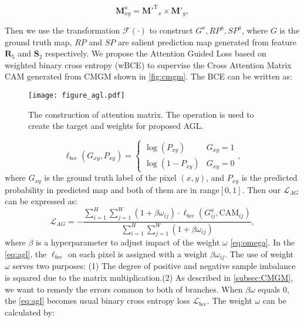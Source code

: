 \documentclass[10pt,twocolumn,letterpaper]{article}
\begin{document}
\begin{equation}
   \bm{M}^{a}_{xy} = {{\bm{M}'}^\mathrm{T}}_{x} \times \bm{M}'_{y} ,
    \label{eq:attention matrix}
\end{equation}

Then we use the transformation $\mathcal {F}(\cdot)$ to construct $G^{a},RP^{a},SP^{a}$, where $G$ is the ground truth map, $RP$ and $SP$ are salient prediction map generated from feature $\bm{R}_5$ and $\bm{S}_2$ respectively. We propose the Attention Guided Loss based on weighted binary cross entropy (wBCE) to supervise the Cross Attention Matrix $\mathrm{CAM}$ generated from CMGM shown in \cref{fig:cmgm}. The BCE \cite{de2005tutorial} can be written as:

\begin{figure}[ht]
\centering
\texttt{[image: figure\_agl.pdf]}
\caption{The construction of attention matrix. The operation is used to create the target and weights for proposed AGL. }
\label{fig:agl1}
\end{figure}

\begin{equation}
    \ell_{bce}(G_{xy},P_{xy}) = 
    \begin{cases}
    \log(P_{xy})& G_{xy}=1 \\
    \log(1-P_{xy})& G_{xy}=0
    \end{cases} ,
    \label{eq:bce}
\end{equation}
where $G_{xy}$ is the ground truth label of the pixel $(x,y)$, and $P_{xy}$ is the predicted probability in predicted map and both of them are in range$[0,1]$. Then our $\mathcal{L}_{AG}$ can be expressed as:
\begin{equation}
    \mathcal{L}_{AG}=-\frac{\sum\limits^H_{i=1}\sum\limits^W_{j=1}(1+\beta\omega_{ij})\cdot \ell_{bce}(G^a_{ij},{\mathrm{CAM}}_{ij})}{\sum\limits^H_{i=1}\sum\limits^W_{j=1}(1+\beta\omega_{ij})} ,
    \label{eq:agl}
\end{equation}
where $\beta$ is a hyperparameter to adjust impact of the weight $\omega$ \cref{eq:omega}. In the \cref{eq:agl}, the $\ell_{bce}$ on each pixel is assigned with a weight $\beta\omega_{ij}$. The use of weight $\omega$ serves two purposes: (1) The degree of positive and negative sample imbalance is squared due to the matrix multiplication.(2) As described in \cref{subsec:CMGM}, we want to remedy the errors common to both of branches. When $\beta \omega$ equals  $0$, the \cref{eq:agl} becomes usual binary cross entropy loss $\mathcal{L}_{bce}$. The weight $\omega$ can be calculated by:
\end{document}
